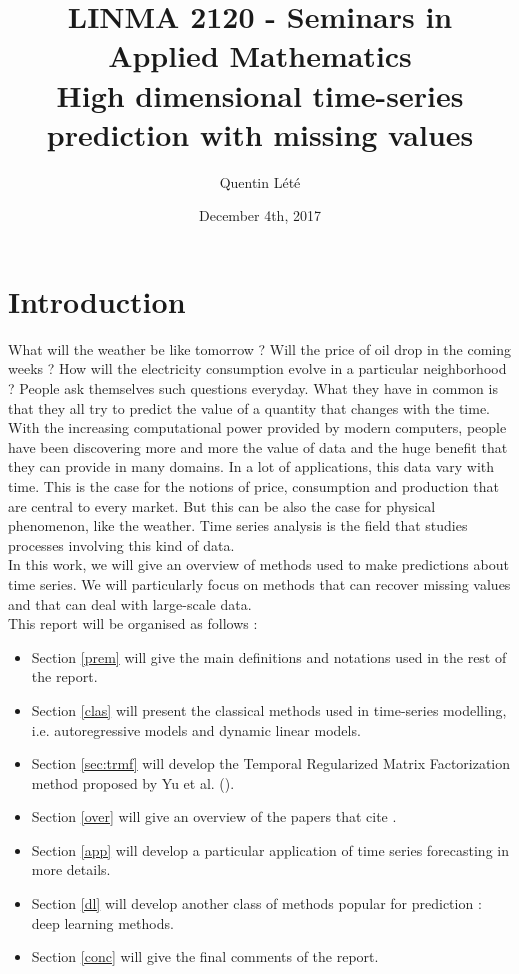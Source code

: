 \documentclass{article}
\title{LINMA 2120 - Seminars in Applied Mathematics \\
        High dimensional time-series prediction with missing values}
\author{Quentin Lété}
\date{December 4th, 2017}
\begin{document}
\maketitle

\section{Introduction}
What will the weather be like tomorrow ?
Will the price of oil drop in the coming weeks ?
How will the electricity consumption evolve in a particular neighborhood ?
People ask themselves such questions everyday.
What they have in common is that they all try to predict the value of a quantity that changes with the time.
With the increasing computational power provided by modern computers, people have been discovering more and more the value of data and the huge benefit that they can provide in many domains.
In a lot of applications, this data vary with time.
This is the case for the notions of price, consumption and production that are central to every market.
But this can be also the case for physical phenomenon, like the weather.
Time series analysis is the field that studies processes involving this kind of data. \\
In this work, we will give an overview of methods used to make predictions about time series.
We will particularly focus on methods that can recover missing values and that can deal with large-scale data.\\

This report will be organised as follows :
\begin{itemize}
\item Section \ref{prem} will give the main definitions and notations used in the rest of the report.
\item Section \ref{clas} will present the classical methods used in time-series modelling, i.e. autoregressive models and dynamic linear models.
\item Section \ref{sec:trmf} will develop the Temporal Regularized Matrix Factorization method proposed by Yu et al. (\cite{TRMF}).
\item Section \ref{over} will give an overview of the papers that cite \cite{TRMF}.
\item Section \ref{app} will develop a particular application of time series forecasting in more details.
\item Section \ref{dl} will develop another class of methods popular for prediction : deep learning methods.
\item Section \ref{conc} will give the final comments of the report.
\end{itemize}
\end{document}
